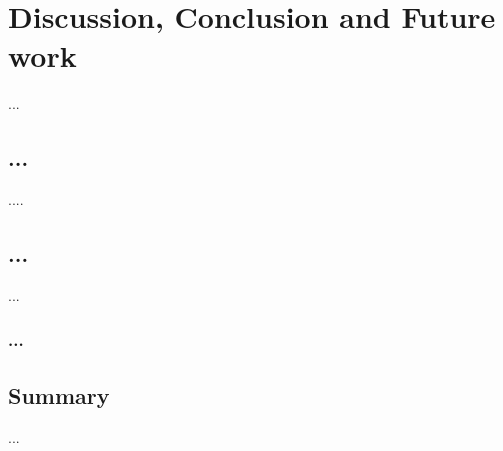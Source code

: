 \chapter{Discussion, Conclusion and Future work}
\label{ch:lit_rev}

...
\section{...}
....


\section{...}
...


\subsection{...}


\section{Summary}
...


